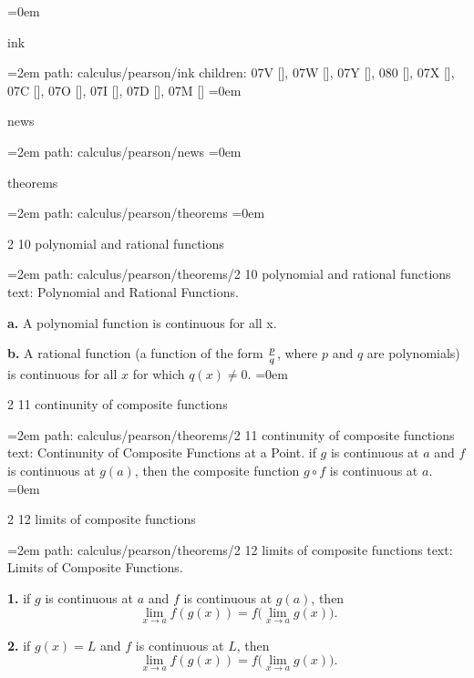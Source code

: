 \smallskip
\leftskip=0em
\par\endgroup
\bigskip
{}
ink
\smallskip
\par\begingroup
\leftskip=2em
path: calculus/pearson/ink
\smallskip
children: 07V [], 07W [], 07Y [], 080 [], 07X [], 07C [], 07O [], 07I [], 07D [], 07M []
\smallskip
\leftskip=0em
\par\endgroup
\bigskip
{}
news
\smallskip
\par\begingroup
\leftskip=2em
path: calculus/pearson/news
\smallskip
\leftskip=0em
\par\endgroup
\bigskip
{}
theorems
\smallskip
\par\begingroup
\leftskip=2em
path: calculus/pearson/theorems
\smallskip
\leftskip=0em
\par\endgroup
\bigskip
{}
2 10 polynomial and rational functions
\smallskip
\par\begingroup
\leftskip=2em
path: calculus/pearson/theorems/2 10 polynomial and rational functions
\smallskip
text:  Polynomial and Rational Functions. \par {\bf a.} A polynomial function is continuous for all x.  \par {\bf b.} A rational function (a function of the form ${p \over q}$, where $p$ and $q$ are polynomials) is continuous for all $x$ for which $q(x) \ne 0$. 
\smallskip
\leftskip=0em
\par\endgroup
\bigskip
{}
2 11 continunity of composite functions
\smallskip
\par\begingroup
\leftskip=2em
path: calculus/pearson/theorems/2 11 continunity of composite functions
\smallskip
text:  Continunity of Composite Functions at a Point. if $g$ is continuous at $a$ and $f$ is continuous at $g(a)$, then the composite function $g \circ f$ is continuous at $a$.
\smallskip
\leftskip=0em
\par\endgroup
\bigskip
{}
2 12 limits of composite functions
\smallskip
\par\begingroup
\leftskip=2em
path: calculus/pearson/theorems/2 12 limits of composite functions
\smallskip
text:  Limits of Composite Functions. \par {\bf 1.} if $g$ is continuous at $a$ and $f$ is continuous at $g(a)$, then  $$\ \lim_{x \to a} f(g(x)) = f\big(\lim_{x \to a} g(x)\big). $$  \par {\bf 2.} if $g(x) = L$ and $f$ is continuous at $L$, then  $$\ \lim_{x \to a} f(g(x)) = f\big(\lim_{x \to a} g(x)\big). $$ 
